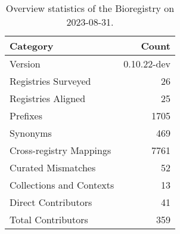 \begin{table}
\caption{Overview statistics of the Bioregistry on 2023-08-31.}
\label{tab:bioregistry-summary}
\begin{tabular}{lr}
\toprule
Category & Count \\
\midrule
Version & 0.10.22-dev \\
Registries Surveyed & 26 \\
Registries Aligned & 25 \\
Prefixes & 1705 \\
Synonyms & 469 \\
Cross-registry Mappings & 7761 \\
Curated Mismatches & 52 \\
Collections and Contexts & 13 \\
Direct Contributors & 41 \\
Total Contributors & 359 \\
\bottomrule
\end{tabular}
\end{table}
